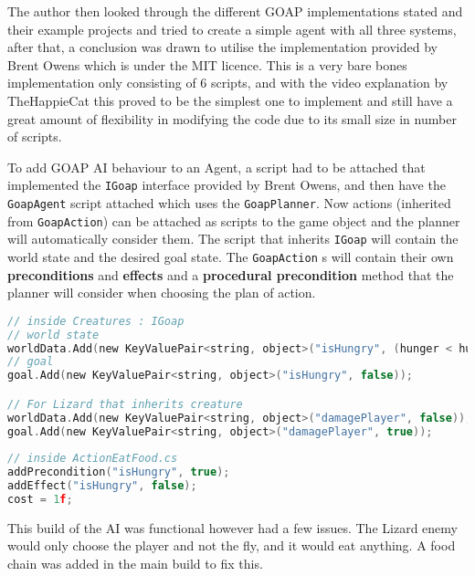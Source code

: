 \documentclass[11pt]{report}
\begin{document}
The author then looked through the different GOAP implementations stated and their example projects and tried to create a simple agent with all three systems, after that, a conclusion was drawn to utilise the implementation provided by Brent Owens \cite{brentOwensGoapCode} which is under the MIT licence. This is a very bare bones implementation only consisting of 6 scripts, and with the video explanation by TheHappieCat this proved to be the simplest one to implement and still have a great amount of flexibility in modifying the code due to its small size in number of scripts.


To add GOAP AI behaviour to an Agent, a script had to be attached that implemented the \lstinline{IGoap} interface provided by Brent Owens, and then have the \lstinline{GoapAgent} script attached which uses the \lstinline{GoapPlanner}. Now actions (inherited from \lstinline{GoapAction}) can be attached as scripts to the game object and the planner will automatically consider them. The script that inherits \lstinline{IGoap} will contain the world state and the desired goal state. The \lstinline{GoapAction} s will contain their own \textbf{preconditions} and \textbf{effects} and a \textbf{procedural precondition} method that the planner will consider when choosing the plan of action. 

\begin{lstlisting}[language=c]
// inside Creatures : IGoap 
// world state
worldData.Add(new KeyValuePair<string, object>("isHungry", (hunger < hungerThreshold)));
// goal
goal.Add(new KeyValuePair<string, object>("isHungry", false));

// For Lizard that inherits creature
worldData.Add(new KeyValuePair<string, object>("damagePlayer", false)); 
goal.Add(new KeyValuePair<string, object>("damagePlayer", true));
 
// inside ActionEatFood.cs
addPrecondition("isHungry", true);
addEffect("isHungry", false);
cost = 1f;
\end{lstlisting}

This build of the AI was functional however had a few issues. The Lizard enemy would only choose the player and not the fly, and it would eat anything. A food chain was added in the main build to fix this.
\end{document}
